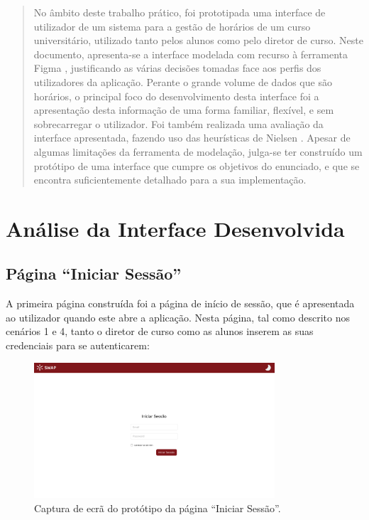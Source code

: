 \documentclass[12pt, a4paper]{article}
\begin{document}
\begin{abstract}
    \noindent
    No âmbito deste trabalho prático, foi prototipada uma interface de utilizador de um sistema para
    a gestão de horários de um curso universitário, utilizado tanto pelos alunos como pelo diretor
    de curso. Neste documento, apresenta-se a interface modelada com recurso à ferramenta Figma
    \cite{figma}, justificando as várias decisões tomadas face aos perfis dos utilizadores da
    aplicação. Perante o grande volume de dados que são horários, o principal foco do
    desenvolvimento desta interface foi a apresentação desta informação de uma forma familiar,
    flexível, e sem sobrecarregar o utilizador. Foi também realizada uma avaliação da interface
    apresentada, fazendo uso das heurísticas de Nielsen \cite{nielsen}. Apesar de algumas limitações
    da ferramenta de modelação, julga-se ter construído um protótipo de uma interface que cumpre os
    objetivos do enunciado, e que se encontra suficientemente detalhado para a sua implementação.
\end{abstract}

\section{Análise da Interface Desenvolvida}

\subsection{Página ``Iniciar Sessão''}

A primeira página construída foi a página de início de sessão, que é apresentada ao utilizador
quando este abre a aplicação. Nesta página, tal como descrito nos cenários 1 e 4, tanto o diretor
de curso como as alunos inserem as suas credenciais para se autenticarem:

\begin{figure}[H]
    \centering
    \includegraphics[width=0.8\textwidth]{res/prototype/iniciar-sessao.png}
    \caption{Captura de ecrã do protótipo da página ``Iniciar Sessão''.}
    \label{iniciar-sessao}
\end{figure}
\end{document}
